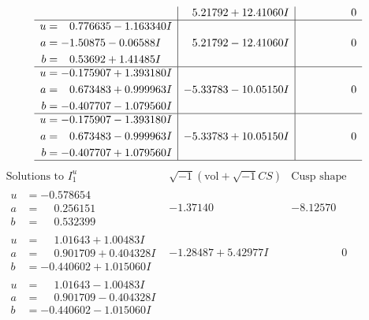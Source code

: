 \documentclass[1p]{elsarticle_modified}
\theoremstyle{definition}
\newcommand{\I}{\sqrt{-1}}
\begin{document}
$$\begin{array}{c|c|c}
 & \phantom{-}5.21792 + 12.41060 I & \phantom{-0.000000 } 0 \\ \hline\begin{aligned}
u &= \phantom{-}0.776635 - 1.163340 I \\
a &= -1.50875 - 0.06588 I \\
b &= \phantom{-}0.53692 + 1.41485 I\end{aligned}
 & \phantom{-}5.21792 - 12.41060 I & \phantom{-0.000000 } 0 \\ \hline\begin{aligned}
u &= -0.175907 + 1.393180 I \\
a &= \phantom{-}0.673483 + 0.999963 I \\
b &= -0.407707 - 1.079560 I\end{aligned}
 & -5.33783 - 10.05150 I & \phantom{-0.000000 } 0 \\ \hline\begin{aligned}
u &= -0.175907 - 1.393180 I \\
a &= \phantom{-}0.673483 - 0.999963 I \\
b &= -0.407707 + 1.079560 I\end{aligned}
 & -5.33783 + 10.05150 I & \phantom{-0.000000 } 0\\
 \hline 
 \end{array}$$\newpage$$\begin{array}{c|c|c}  
\text{Solutions to }I^u_{1}& \I (\text{vol} + \sqrt{-1}CS) & \text{Cusp shape}\\
 \hline 
\begin{aligned}
u &= -0.578654\phantom{ +0.000000I} \\
a &= \phantom{-}0.256151\phantom{ +0.000000I} \\
b &= \phantom{-}0.532399\phantom{ +0.000000I}\end{aligned}
 & -1.37140\phantom{ +0.000000I} & -8.12570\phantom{ +0.000000I} \\ \hline\begin{aligned}
u &= \phantom{-}1.01643 + 1.00483 I \\
a &= \phantom{-}0.901709 + 0.404328 I \\
b &= -0.440602 + 1.015060 I\end{aligned}
 & -1.28487 + 5.42977 I & \phantom{-0.000000 } 0 \\ \hline\begin{aligned}
u &= \phantom{-}1.01643 - 1.00483 I \\
a &= \phantom{-}0.901709 - 0.404328 I \\
b &= -0.440602 - 1.015060 I\end{aligned}

\end{array}$$
\end{document}
